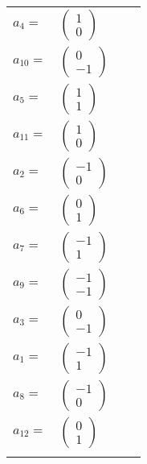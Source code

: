 \documentclass[1p]{elsarticle_modified}
\theoremstyle{definition}
\begin{document}
\begin{tabular}{m{7pt} m{180pt} m{7pt} m{180pt} }
\flushright $a_{4}=$&$\begin{pmatrix}1\\0\end{pmatrix}$ \\
\flushright $a_{10}=$&$\begin{pmatrix}0\\-1\end{pmatrix}$ \\
\flushright $a_{5}=$&$\begin{pmatrix}1\\1\end{pmatrix}$ \\
\flushright $a_{11}=$&$\begin{pmatrix}1\\0\end{pmatrix}$ \\
\flushright $a_{2}=$&$\begin{pmatrix}-1\\0\end{pmatrix}$ \\
\flushright $a_{6}=$&$\begin{pmatrix}0\\1\end{pmatrix}$ \\
\flushright $a_{7}=$&$\begin{pmatrix}-1\\1\end{pmatrix}$ \\
\flushright $a_{9}=$&$\begin{pmatrix}-1\\-1\end{pmatrix}$ \\
\flushright $a_{3}=$&$\begin{pmatrix}0\\-1\end{pmatrix}$ \\
\flushright $a_{1}=$&$\begin{pmatrix}-1\\1\end{pmatrix}$ \\
\flushright $a_{8}=$&$\begin{pmatrix}-1\\0\end{pmatrix}$ \\
\flushright $a_{12}=$&$\begin{pmatrix}0\\1\end{pmatrix}$\\&\end{tabular}
\end{document}
